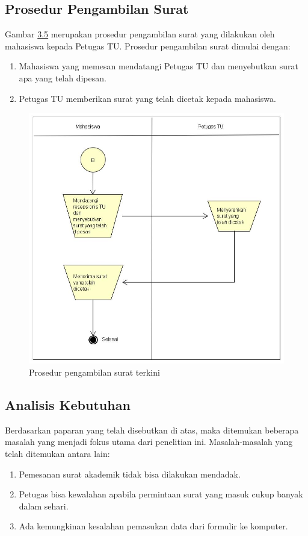 \subsection{Prosedur Pengambilan Surat}
\label{sec:prosedur_pengambilan_surat}
Gambar \hyperlink{pengambilan_terkini}{3.5} merupakan prosedur pengambilan surat yang dilakukan oleh mahasiswa kepada Petugas TU. Prosedur pengambilan surat dimulai dengan:
\begin{enumerate}
	\item Mahasiswa yang memesan mendatangi Petugas TU dan menyebutkan surat apa yang telah dipesan.
	\item Petugas TU memberikan surat yang telah dicetak kepada mahasiswa.
\end{enumerate}

\begin{figure}[H]
	\centering
		\includegraphics[scale=0.35]{Gambar/Diagram/sistem_terkini/work_flow/pengambilan_terkini.jpg}
	{\caption{Prosedur pengambilan surat terkini}}
	\label{fig:pengambilan_terkini}
\end{figure}

\subsection{Analisis Kebutuhan}
\label{sec:analisis_kebutuhan}
Berdasarkan paparan yang telah disebutkan di atas, maka ditemukan beberapa masalah yang menjadi fokus utama dari penelitian ini. Masalah-masalah yang telah ditemukan antara lain:
\begin{enumerate}
	\item Pemesanan surat akademik tidak bisa dilakukan mendadak.
	\item Petugas bisa kewalahan apabila permintaan surat yang masuk cukup banyak dalam sehari.
	\item Ada kemungkinan kesalahan pemasukan data dari formulir ke komputer.
\end{enumerate}

